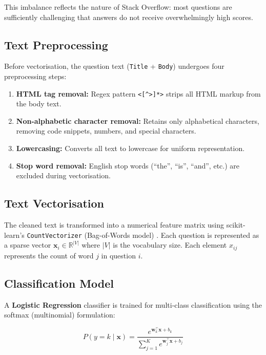 \documentclass[12pt, a4paper]{article}
\begin{document}
This imbalance reflects the nature of Stack Overflow: most questions are sufficiently challenging that answers do not receive overwhelmingly high scores.

\subsection{Text Preprocessing}

Before vectorisation, the question text (\texttt{Title} + \texttt{Body}) undergoes four preprocessing steps:

\begin{enumerate}[noitemsep]
    \item \textbf{HTML tag removal:} Regex pattern \texttt{<[{\textasciicircum}>]*>} strips all HTML markup from the body text.
    \item \textbf{Non-alphabetic character removal:} Retains only alphabetical characters, removing code snippets, numbers, and special characters.
    \item \textbf{Lowercasing:} Converts all text to lowercase for uniform representation.
    \item \textbf{Stop word removal:} English stop words (``the'', ``is'', ``and'', etc.) are excluded during vectorisation.
\end{enumerate}

\subsection{Text Vectorisation}

The cleaned text is transformed into a numerical feature matrix using scikit-learn's \texttt{CountVectorizer} (Bag-of-Words model) \citep{sklearn}. Each question is represented as a sparse vector $\mathbf{x}_i \in \mathbb{R}^{|V|}$ where $|V|$ is the vocabulary size. Each element $x_{ij}$ represents the count of word $j$ in question $i$.

\subsection{Classification Model}

A \textbf{Logistic Regression} classifier is trained for multi-class classification using the softmax (multinomial) formulation:

\begin{equation}
    P(y = k \mid \mathbf{x}) = \frac{e^{\mathbf{w}_k^\top \mathbf{x} + b_k}}{\sum_{j=1}^{K} e^{\mathbf{w}_j^\top \mathbf{x} + b_j}}
    \label{eq:softmax}
\end{equation}
\end{document}

